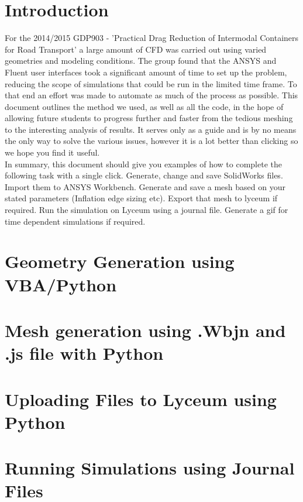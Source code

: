 \documentclass[12pt,a4paper,twoside,openright,titlepage]{report}
\begin{document}


\thispagestyle{empty}
\clearpage


\thispagestyle{plain}
\section{Introduction}

For the 2014/2015 GDP903 - 'Practical Drag Reduction of Intermodal Containers for Road Transport' a large amount of CFD was carried out using varied geometries and modeling conditions. The group found that the ANSYS and Fluent user interfaces took a significant amount of time to set up the problem, reducing the scope of simulations that could be run in the limited time frame. To that end an effort was made to automate as much of the process as possible. This document outlines the method we used, as well as all the code, in the hope of allowing future students to progress further and faster from the tedious meshing to the interesting analysis of results. It serves only as a guide and is by no means the only way to solve the various issues, however it is a lot better than clicking so we hope you find it useful.\\

In summary, this document should give you examples of how to complete the following task with a single click. Generate, change and save SolidWorks files. Import them to ANSYS Workbench. Generate and save a mesh based on your stated parameters (Inflation edge sizing etc). Export that mesh to lyceum if required. Run the simulation on Lyceum using a journal file. Generate a gif for time dependent simulations if required.\\

\section{Geometry Generation using VBA/Python}


\section{Mesh generation using .Wbjn and .js file with Python}


\section{Uploading Files to Lyceum using Python}


\section{Running Simulations using Journal Files}


\end{document}
